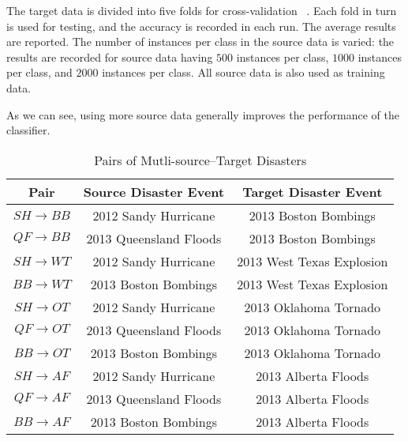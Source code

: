 The target data is divided into five folds for cross-validation ~\citep{hastie}. Each fold in turn is used for testing, and the accuracy is recorded in each run. The average results are reported. The number of instances per class in the source data is varied: the results are recorded for source data having $500$ instances per class, $1000$ instances per class, and $2000$ instances per class. All source data is also used as training data. 

As we can see, using more source data generally improves the performance of the classifier.

\begin{table}[ht]
    \begin{center}
    \caption{Pairs of Mutli-source--Target Disasters}
    \begin{tabular}[c]{|c|c|c|}
        \hline
        Pair & Source Disaster Event & Target Disaster Event  \\
        \hline
        $SH \rightarrow BB$ & 2012 Sandy Hurricane & 2013 Boston Bombings \\
        $QF \rightarrow BB$ & 2013 Queensland Floods & 2013 Boston Bombings \\

        $SH \rightarrow WT$ & 2012 Sandy Hurricane & 2013 West Texas Explosion \\
        $BB \rightarrow WT$ & 2013 Boston Bombings & 2013 West Texas Explosion \\

        $SH \rightarrow OT$ & 2012 Sandy Hurricane & 2013 Oklahoma Tornado \\
        $QF \rightarrow OT$ & 2013 Queensland Floods & 2013 Oklahoma Tornado \\
        $BB \rightarrow OT$ & 2013 Boston Bombings & 2013 Oklahoma Tornado  \\

        $SH \rightarrow AF$ & 2012 Sandy Hurricane & 2013 Alberta Floods \\
        $QF \rightarrow AF$ & 2013 Queensland Floods & 2013 Alberta Floods \\
        $BB \rightarrow AF$ & 2013 Boston Bombings & 2013 Alberta Floods \\
        \hline
    \end{tabular}
    \label{pairstablemulti}
   \end{center}
\end{table}


